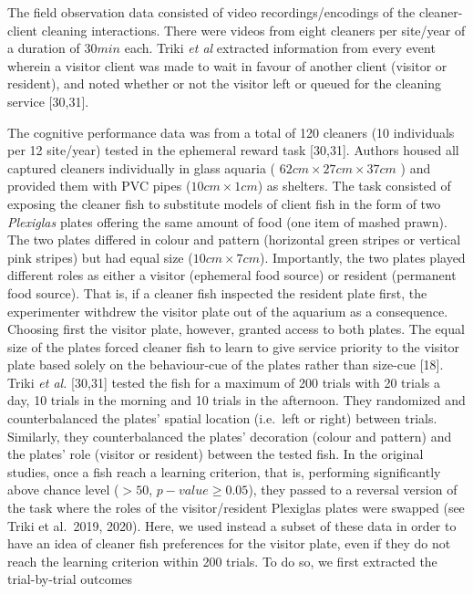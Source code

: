 \documentclass[10pt,letterpaper]{article}
\begin{document}
The field observation data consisted of video recordings/encodings of
the cleaner-client cleaning interactions. There were videos from eight
cleaners per site/year of a duration of \(30 min\) each. Triki \emph{et
al} extracted information from every event wherein a visitor client was
made to wait in favour of another client (visitor or resident), and
noted whether or not the visitor left or queued for the cleaning service
{[}30,31{]}.

The cognitive performance data was from a total of 120 cleaners (10
individuals per 12 site/year) tested in the ephemeral reward task
{[}30,31{]}. Authors housed all captured cleaners individually in glass
aquaria ( \(62cm \times 27cm \times 37 cm\) ) and provided them with PVC
pipes (\(10 cm \times 1 cm\)) as shelters. The task consisted of
exposing the cleaner fish to substitute models of client fish in the
form of two \emph{Plexiglas} plates offering the same amount of food
(one item of mashed prawn). The two plates differed in colour and
pattern (horizontal green stripes or vertical pink stripes) but had
equal size (\(10 cm \times 7 cm\)). Importantly, the two plates played
different roles as either a visitor (ephemeral food source) or resident
(permanent food source). That is, if a cleaner fish inspected the
resident plate first, the experimenter withdrew the visitor plate out of
the aquarium as a consequence. Choosing first the visitor plate,
however, granted access to both plates. The equal size of the plates
forced cleaner fish to learn to give service priority to the visitor
plate based solely on the behaviour-cue of the plates rather than
size-cue {[}18{]}. Triki \emph{et al.} {[}30,31{]} tested the fish for a
maximum of 200 trials with 20 trials a day, 10 trials in the morning and
10 trials in the afternoon. They randomized and counterbalanced the
plates' spatial location (i.e.~left or right) between trials. Similarly,
they counterbalanced the plates' decoration (colour and pattern) and the
plates' role (visitor or resident) between the tested fish. In the
original studies, once a fish reach a learning criterion, that is,
performing significantly above chance level (\(> 50%
\), \(p-value ≥ 0.05\)), they passed to a reversal version of the task
where the roles of the visitor/resident Plexiglas plates were swapped
(see Triki et al.~2019, 2020). Here, we used instead a subset of these
data in order to have an idea of cleaner fish preferences for the
visitor plate, even if they do not reach the learning criterion within
200 trials. To do so, we first extracted the trial-by-trial outcomes
\end{document}

